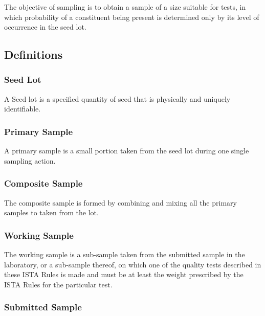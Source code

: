 \documentclass[
]{book}
\begin{document}
The objective of sampling is to obtain a sample of a size suitable for tests, in which probability of a constituent being present is determined only by its level of occurrence in the seed lot.

\hypertarget{definitions}{%
\subsection{Definitions}\label{definitions}}

\hypertarget{seed-lot}{%
\subsubsection{Seed Lot}\label{seed-lot}}

A Seed lot is a specified quantity of seed that is physically and uniquely identifiable.

\hypertarget{primary-sample}{%
\subsubsection{Primary Sample}\label{primary-sample}}

A primary sample is a small portion taken from the seed lot during one single sampling action.

\hypertarget{composite-sample}{%
\subsubsection{Composite Sample}\label{composite-sample}}

The composite sample is formed by combining and mixing all the primary samples to taken from the lot.

\hypertarget{working-sample}{%
\subsubsection{Working Sample}\label{working-sample}}

The working sample is a sub-sample taken from the submitted sample in the laboratory, or a sub-sample thereof, on which one of the quality tests described in these ISTA Rules is made and must be at least the weight prescribed by the ISTA Rules for the particular test.

\hypertarget{submitted-sample}{%
\subsubsection{Submitted Sample}\label{submitted-sample}}
\end{document}
